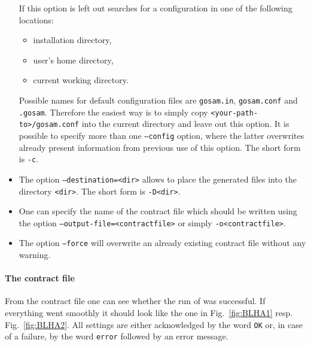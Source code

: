 \begin{itemize}
   If  this option is left out \gosam{} searches for a configuration
   in one of the following locations:
   \begin{itemize}
   \item \gosam{} installation directory,
   \item user's home directory,
   \item current working directory.
   \end{itemize}
   Possible names for default configuration files are \texttt{gosam.in},
   \texttt{gosam.conf} and \texttt{.gosam}. Therefore the easiest way is to simply copy
   \texttt{<your-path-to>/\hspace{0pt}gosam.conf}
   into the current directory and leave out this option.
   It is possible to specify more than one \texttt{--config} option, where the latter
   overwrites already present information from previous use of this
   option. The short form is \texttt{-c}.
\item  The option \texttt{--destination=<dir>} allows 
   to place the generated files into the directory \texttt{<dir>}.
   The short form is \texttt{-D<dir>}.
\item One can specify the name of the contract file which should be written
   using the option \texttt{--output-file=<contractfile>} or simply
   \texttt{-o<contractfile>}.
\item The option \texttt{--force} will overwrite an already existing
   contract file without any warning. 
\end{itemize}

\paragraph{The contract file}
From the contract file one can see whether the run of \gosam{} was successful.
If everything went smoothly it should look like the one in Fig.~\ref{fig:BLHA1}
resp. Fig.~\ref{fig:BLHA2}.
All settings are either acknowledged by the word \texttt{OK} or, in case
of a failure, by the word \texttt{error} followed by an error message.


